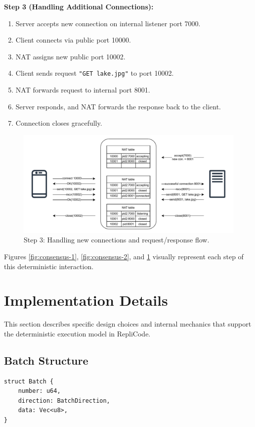 \documentclass[10pt, 
]{IEEEtran}
\begin{document}
\textbf{Step 3 (Handling Additional Connections):}
\begin{enumerate}
\item Server accepts new connection on internal listener port 7000.
\item Client connects via public port 10000.
\item NAT assigns new public port 10002.
\item Client sends request \texttt{"GET lake.jpg"} to port 10002.
\item NAT forwards request to internal port 8001.
\item Server responds, and NAT forwards the response back to the client.
\item Connection closes gracefully.
\end{enumerate}

\begin{figure}[h]
\centering
\includegraphics[width=0.9\linewidth]{consensus_diagram_3.pdf}
\caption{Step 3: Handling new connections and request/response flow.}
\label{fig:consensus-3}
\end{figure}

Figures \ref{fig:consensus-1}, \ref{fig:consensus-2}, and \ref{fig:consensus-3} visually represent each step of this deterministic interaction.


\section{Implementation Details}

This section describes specific design choices and internal mechanics that support the deterministic execution model in RepliCode.

\subsection{Batch Structure}

\begin{verbatim}
struct Batch {
    number: u64,
    direction: BatchDirection,
    data: Vec<u8>,
}  
\end{verbatim}
\end{document}
